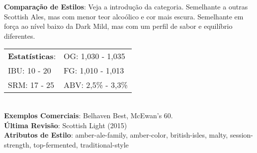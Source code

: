 \textbf{Comparação de Estilos}: Veja a introdução da categoria. Semelhante a outras Scottish Ales, mas com menor teor alcoólico e cor mais escura. Semelhante em força ao nível baixo da Dark Mild, mas com um perfil de sabor e equilíbrio diferentes. \\
\begin{tabular}{@{}p{35mm}p{35mm}@{}}
  \textbf{Estatísticas}: & OG: 1,030 - 1,035 \\
  IBU: 10 - 20  & FG: 1,010 - 1,013  \\
  SRM: 17 - 25  & ABV: 2,5\% - 3,3\%
\end{tabular}\\
\textbf{Exemplos Comerciais}: Belhaven Best, McEwan's 60. \\
\textbf{Última Revisão}: Scottish Light (2015) \\
\textbf{Atributos de Estilo}: amber-ale-family, amber-color, british-isles, malty, session-strength, top-fermented, traditional-style